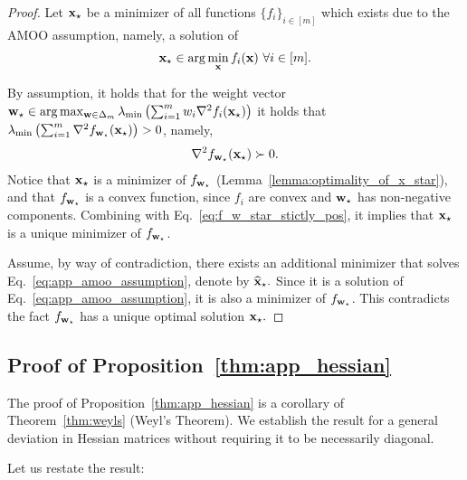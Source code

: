 \UniqueSol*

\begin{proof}
Let ${\mathbf{x}}_\star$ be a minimizer of all functions $\{ f_i\}_{i\in[m]}$ which exists due to the AMOO assumption, namely, a solution of 
\begin{align}
    {\mathbf{x}}_\star \in \arg\min_{{\mathbf{x}}} f_i({\mathbf{x}})\ \forall i\in [m]. \label{eq:app_amoo_assumption}
\end{align}
 
By assumption, it holds that for the weight vector ${\mathbf{w}}_\star\in \arg\max_{{\mathbf{w}}\in \Delta_m}\lambda_{\min}\left(\sum_{i=1}^m w_i \nabla^2 f_i({\mathbf{x}}_\star) \right)$ it holds that $\lambda_{\min}\left(\sum_{i=1}^m \nabla^2 f_{{\mathbf{w}}_\star}({\mathbf{x}}_\star) \right)>0$, namely,
\begin{align}
    \nabla^2 f_{{\mathbf{w}}_\star}({\mathbf{x}}_\star) \succ 0. \label{eq:f_w_star_stictly_pos}
\end{align}
Notice that ${\mathbf{x}}_\star$ is a minimizer of $f_{{\mathbf{w}}_\star}$ (Lemma~\ref{lemma:optimality_of_x_star}), and that $f_{{\mathbf{w}}_\star}$ is a convex function, since $f_i$ are convex and ${\mathbf{w}}_\star$ has non-negative components. Combining with Eq.~\eqref{eq:f_w_star_stictly_pos}, it implies that ${\mathbf{x}}_\star$ is a unique minimizer of $f_{{\mathbf{w}}_\star}$.

Assume, by way of contradiction, there exists an additional minimizer that solves Eq.~\eqref{eq:app_amoo_assumption}, denote by $\widehat{{\mathbf{x}}}_\star.$ Since it is a solution of Eq.~\eqref{eq:app_amoo_assumption}, it is also a minimizer of $f_{{\mathbf{w}}_\star}$. This contradicts the fact $f_{{\mathbf{w}}_\star}$ has a unique optimal solution ${\mathbf{x}}_\star.$ 

\end{proof}


\subsection{Proof of Proposition~\ref{thm:app_hessian}}\label{app:weyls consequence}
The proof of Proposition~\ref{thm:app_hessian} is a corollary of Theorem~\ref{thm:weyls} (Weyl's Theorem). We establish the result for a general deviation in Hessian matrices without requiring it to be necessarily diagonal.

Let us restate the result:
\ApproxHessian*

